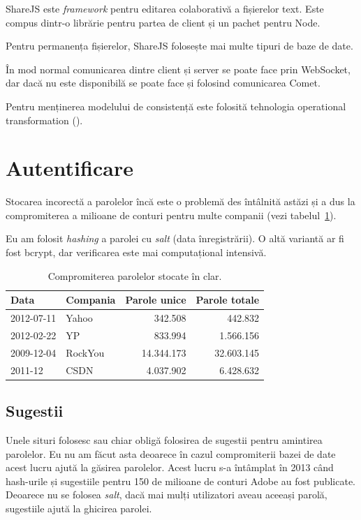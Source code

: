 \documentclass[a4wide,12pt]{report}
\newcommand{\eng}[1]{\emph{#1}} %
\newcommand{\acr}[1]{{\textsmaller[1]{\textsc{#1}}}} %
\begin{document}
ShareJS este \eng{framework} pentru editarea colaborativă a fișierelor text.
Este compus dintr-o librărie pentru partea de client și un pachet pentru Node.

Pentru permanența fișierelor, ShareJS folosește mai multe tipuri de baze de
date.

În mod normal comunicarea dintre client și server se poate face prin WebSocket,
dar dacă nu este disponibilă se poate face și folosind comunicarea Comet.

Pentru menținerea modelului de consistență este folosită tehnologia operational
transformation (\acr{OT}).

\section{Autentificare}

Stocarea incorectă a parolelor încă este o problemă des întâlnită astăzi și a
dus la compromiterea a milioane de conturi pentru multe companii (vezi
tabelul~\ref{paroletab}).

Eu am folosit \eng{hashing} a parolei cu \eng{salt} (data înregistrării). O altă
variantă ar fi fost bcrypt, dar verificarea este mai computațional intensivă.

\begin{table}[hb]
\begin{center}
\begin{tabular}{l l r r}
Data & Compania & Parole unice & Parole totale \\
\hline
2012-07-11 & Yahoo & 342.508 & 442.832 \\
2012-02-22 & YP & 833.994 & 1.566.156 \\
2009-12-04 & RockYou & 14.344.173 & 32.603.145 \\
2011-12 & CSDN & 4.037.902 & 6.428.632 \\
\end{tabular}
\end{center}
\caption{Compromiterea parolelor stocate în clar\cite{passleak}.}
\label{paroletab}
\end{table}

\subsection{Sugestii}

Unele situri folosesc sau chiar obligă folosirea de sugestii pentru amintirea
parolelor. Eu nu am făcut asta deoarece în cazul compromiterii bazei de date
acest lucru ajută la găsirea parolelor. Acest lucru s-a întâmplat în 2013 când
hash-urile și sugestiile pentru 150 de milioane de conturi Adobe au fost
publicate. Deoarece nu se folosea \eng{salt}, dacă mai mulți utilizatori aveau
aceeași parolă, sugestiile ajută la ghicirea parolei.
\end{document}
